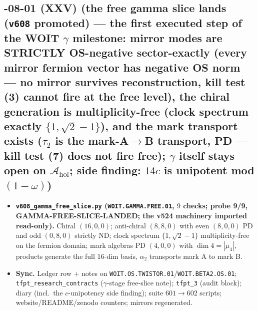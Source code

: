 \documentclass[11pt]{article}
\begin{document}
\subsection*{-08-01 (XXV) (the free gamma slice lands (\texttt{v608} promoted) --- the first executed step of the WOIT $\gamma$ milestone: mirror modes are STRICTLY OS-negative sector-exactly (every mirror fermion vector has negative OS norm --- no mirror survives reconstruction, kill test (3) cannot fire at the free level), the chiral generation is multiplicity-free (clock spectrum exactly $\{1,\sqrt2-1\}$), and the mark transport exists ($\tau_2$ is the mark-A$\to$B transport, PD --- kill test (7) does not fire free); $\gamma$ itself stays open on $\mathcal A_{\mathrm{hol}}$; side finding: $14c$ is unipotent mod $(1-\omega)$)}
\begin{itemize}[leftmargin=1.5em]
\item \textbf{\texttt{v608\_gamma\_free\_slice.py} (\texttt{WOIT.GAMMA.FREE.01}, $9$ checks;
probe 9/9, GAMMA-FREE-SLICE-LANDED; the v524 machinery imported read-only).} Chiral
$(16,0,0)$; anti-chiral $(8,8,0)$ with even $(8,0,0)$ PD and odd $(0,8,0)$ strictly ND;
clock spectrum $\{1,\sqrt2-1\}$ multiplicity-free on the fermion domain; mark algebras PD
$(4,0,0)$ with $\dim 4=|\mu_4|$, products generate the full $16$-dim basis, $\alpha_2$
transports mark A to mark B.
\item \textbf{Sync.} Ledger row + notes on
\texttt{WOIT.OS.TWISTOR.01}/\texttt{WOIT.BETA2.OS.01};
\texttt{tfpt\_research\_contracts} ($\gamma$-stage free-slice note); \texttt{tfpt\_3} (audit
block); diary (incl.\ the $c$-unipotency side finding); suite $601\to602$ scripts;
website/README/zenodo counters; mirrors regenerated.
\end{itemize}
\end{document}
